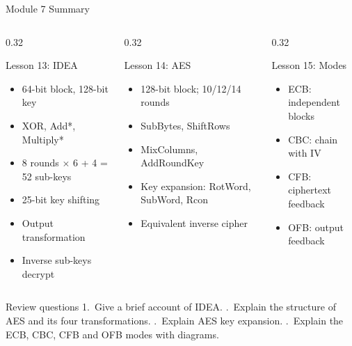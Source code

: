 \documentclass[aspectratio=169,11pt,xcolor={table}]{beamer}
\begin{document}
\begin{frame}{Module 7 Summary}
  \begin{columns}[T]
    \begin{column}{0.32\textwidth}
      \begin{block}{Lesson 13: IDEA}
        \scriptsize
        \begin{itemize}\setlength{\itemsep}{0pt}
          \item 64-bit block, 128-bit key
          \item XOR, Add*, Multiply*
          \item 8 rounds $\times$ 6 + 4 = 52 sub-keys
          \item 25-bit key shifting
          \item Output transformation
          \item Inverse sub-keys decrypt
        \end{itemize}
      \end{block}
    \end{column}
    \begin{column}{0.32\textwidth}
      \begin{alertblock}{Lesson 14: AES}
        \scriptsize
        \begin{itemize}\setlength{\itemsep}{0pt}
          \item 128-bit block; 10/12/14 rounds
          \item SubBytes, ShiftRows
          \item MixColumns, AddRoundKey
          \item Key expansion: RotWord, SubWord, Rcon
          \item Equivalent inverse cipher
        \end{itemize}
      \end{alertblock}
    \end{column}
    \begin{column}{0.32\textwidth}
      \begin{exampleblock}{Lesson 15: Modes}
        \scriptsize
        \begin{itemize}\setlength{\itemsep}{0pt}
          \item ECB: independent blocks
          \item CBC: chain with IV
          \item CFB: ciphertext feedback
          \item OFB: output feedback
        \end{itemize}
      \end{exampleblock}
    \end{column}
  \end{columns}
  \vspace{2mm}
  \begin{alertblock}{Review questions}
    \small
    1.~Give a brief account of IDEA. .~Explain the structure of AES and its four transformations. .~Explain AES key expansion. .~Explain the ECB, CBC, CFB and OFB modes with diagrams.
  \end{alertblock}
\end{frame}
\end{document}
